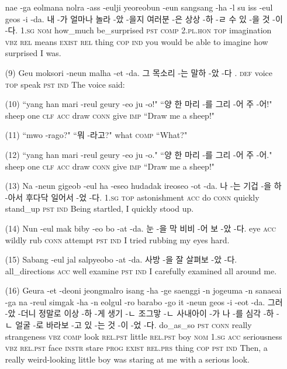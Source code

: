 \begin{itemize}
\tgl
		{nae -ga eolmana nolra -ass -eulji yeoreobun -eun sangsang -ha -l su iss -eul geos -i -da.}
		{내 -가 얼마나 놀라 -았 -을지 여러분 -은 상상 -하 -ㄹ 수 있 -을 것 -이 -다.}
		{\textsc{1.sg}	\textsc{nom}	how\_much	be\_surprised	\textsc{pst}	\textsc{comp}	\textsc{2.pl.hon}	\textsc{top}	imagination	\textsc{vbz}	\textsc{rel}	means	\textsc{exist}	\textsc{rel}	thing	\textsc{cop}	\textsc{ind}}
		{you would be able to imagine how surprised I was.}
		

\item [(9)]
\tgl
		{Geu moksori -neun malha -et -da.}
		{그 목소리 -는 말하 -았 -다 .}
		{\textsc{def}	voice	\textsc{top}	speak	\textsc{pst}	\textsc{ind}}
		{The voice said:}
		
\item [(10)]
\tgl
		{``yang han mari -reul geury -eo ju -o!"}
		{``양 한 마리 -를 그리 -어 주 -어!"}
		{sheep	one	\textsc{clf}	\textsc{acc}	draw	\textsc{conn}	give	\textsc{imp}}
		{``Draw me a sheep!"}

\item [(11)]
\tgl
		{``mwo -rago?"}
		{``뭐 -라고?"}
		{what	\textsc{comp}}
		{``What?"}
		
\item [(12)]
\tgl
		{``yang han mari -reul geury -eo ju -o."}
		{``양 한 마리 -를 그리 -어 주 -어."}
		{sheep	one	\textsc{clf}	\textsc{acc}	draw	\textsc{conn}	give	\textsc{imp}}
		{``Draw me a sheep!"}
		
\item [(13)]
\tgl
		{Na -neun gigeob -eul ha -eseo hudadak ireoseo -ot -da.}
		{나 -는 기겁 -을 하 -아서 후다닥 일어서 -었 -다.}
		{\textsc{1.sg}	\textsc{top}	astonishment	\textsc{acc}	do	\textsc{conn}	quickly	stand\_up	\textsc{pst}	\textsc{ind}}
		{Being startled, I quickly stood up.}
		
\item [(14)]
\tgl
		{Nun -eul mak biby -eo bo -at -da.}
		{눈 -을 막 비비 -어 보 -았 -다.}
		{eye	\textsc{acc}	wildly	rub	\textsc{conn}	attempt	\textsc{pst}	\textsc{ind}}
		{I tried rubbing my eyes hard.}
		
\item [(15)]
\tgl
		{Sabang -eul jal salpyeobo -at -da.}
		{사방 -을 잘 살펴보 -았 -다.}
		{all\_directions	\textsc{acc}	well	examine	\textsc{pst}	\textsc{ind}}
		{I carefully examined all around me.}
		
\item [(16)]
\tgl
		{Geura -et -deoni jeongmalro isang -ha -ge saenggi -n jogeuma -n sanaeai -ga na -reul simgak -ha -n eolgul -ro barabo -go it -neun geos -i -eot -da.}
		{그러 -았 -더니 정말로 이상 -하 -게 생기 -ㄴ 조그맣 -ㄴ 사내아이 -가 나 -를 심각 -하 -ㄴ 얼굴 -로 바라보 -고 있 -는 것 -이 -었 -다.}
		{do\_as\_so	\textsc{pst}	\textsc{conn}	really	strangeness	\textsc{vbz}	\textsc{comp}	look	\textsc{rel.pst}	little	\textsc{rel.pst}	boy	\textsc{nom}	\textsc{1.sg}	\textsc{acc}	seriousness	\textsc{vbz}	\textsc{rel.pst}	face	\textsc{instr}	stare	\textsc{prog}	\textsc{exist}	\textsc{rel.prs}	thing	\textsc{cop}	\textsc{pst}	\textsc{ind}}
		{Then, a really weird-looking little boy was staring at me with a serious look.}
		

\end{itemize}
